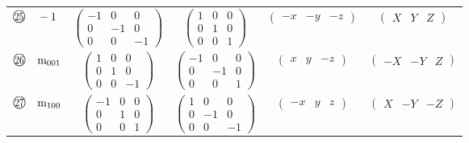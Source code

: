 \documentclass[fleqn,10pt,landscape]{jsarticle}
\begin{document}
\begin{center}
\begin{longtable}{lcccc}
$ {\ooalign{\hfil\resizebox{.8\width}{\height}{25}\hfil\crcr\raise.1ex\hbox{\large$\bigcirc$}}}\quad -1 $ & $ \begin{pmatrix} -1 & 0 & 0 \\ 0 & -1 & 0 \\ 0 & 0 & -1 \end{pmatrix} $ & $ \begin{pmatrix} 1 & 0 & 0 \\ 0 & 1 & 0 \\ 0 & 0 & 1 \end{pmatrix} $ & $ \begin{pmatrix} - x & - y & - z \end{pmatrix} $ & $ \begin{pmatrix} X & Y & Z \end{pmatrix} $ \\
$ {\ooalign{\hfil\resizebox{.8\width}{\height}{26}\hfil\crcr\raise.1ex\hbox{\large$\bigcirc$}}}\quad {\rm m}_{001} $ & $ \begin{pmatrix} 1 & 0 & 0 \\ 0 & 1 & 0 \\ 0 & 0 & -1 \end{pmatrix} $ & $ \begin{pmatrix} -1 & 0 & 0 \\ 0 & -1 & 0 \\ 0 & 0 & 1 \end{pmatrix} $ & $ \begin{pmatrix} x & y & - z \end{pmatrix} $ & $ \begin{pmatrix} - X & - Y & Z \end{pmatrix} $ \\
$ {\ooalign{\hfil\resizebox{.8\width}{\height}{27}\hfil\crcr\raise.1ex\hbox{\large$\bigcirc$}}}\quad {\rm m}_{100} $ & $ \begin{pmatrix} -1 & 0 & 0 \\ 0 & 1 & 0 \\ 0 & 0 & 1 \end{pmatrix} $ & $ \begin{pmatrix} 1 & 0 & 0 \\ 0 & -1 & 0 \\ 0 & 0 & -1 \end{pmatrix} $ & $ \begin{pmatrix} - x & y & z \end{pmatrix} $ & $ \begin{pmatrix} X & - Y & - Z \end{pmatrix} $ \\

\end{longtable}
\end{center}
\end{document}
